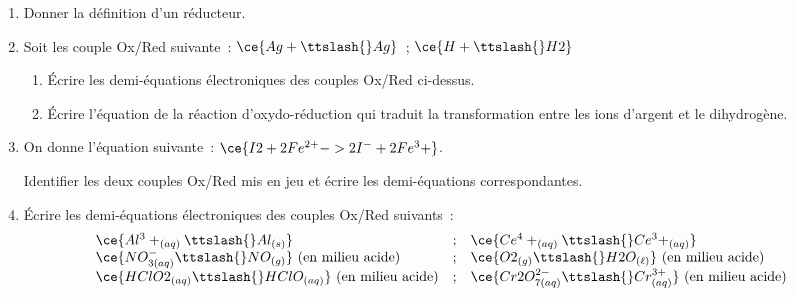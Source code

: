 \begin{enumerate}
    \item Donner la définition d'un réducteur.
    \item Soit les couple Ox/Red suivante~: $\ce{Ag+\ttslash{}Ag}$~;
          $\ce{H+\ttslash{}H2}$
          \begin{enumerate}
              \item Écrire les demi-équations électroniques des couples Ox/Red
                    ci-dessus.
              \item Écrire l'équation de la réaction d'oxydo-réduction qui
                    traduit la transformation entre les ions d'argent et le
                    dihydrogène.
          \end{enumerate}
    \item On donne l'équation suivante~: $\ce{I2 + 2Fe^{2+} -> 2I^- + 2Fe^3+}$.
          
          Identifier les deux couples Ox/Red mis en jeu et écrire les
          demi-équations correspondantes.
    \item Écrire les demi-équations électroniques des couples Ox/Red suivants~:
          \[
              \begin{array}{lcl}
                  \ce{Al^3+_{(aq)}\ttslash{}Al_{(s)}} & ; &
                  \ce{Ce^4+_{(aq)}\ttslash{}Ce^3+_{(aq)}} \\
                  \ce{NO^-_{3(aq)}\ttslash{}NO_{(g)}} \
                  (\text{en milieu acide}) & ; &
                  \ce{O2_{(g)}\ttslash{}H2O_{(\ell)}} \
                  (\text{en milieu acide}) \\
                  \ce{HClO2_{(aq)}\ttslash{}HClO_{(aq)}} \
                  (\text{en milieu acide}) & ; &
                  \ce{Cr2O^{2-}_{7(aq)}\ttslash{}Cr^{3+}_{(aq)}} \
                  (\text{en milieu acide}) \\
              \end{array}
          \]
\end{enumerate}

